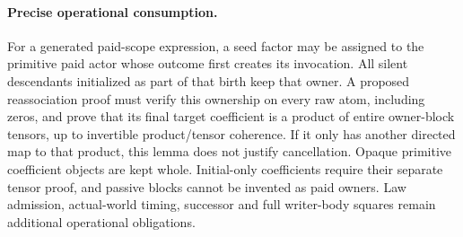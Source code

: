 \documentclass[11pt]{article}
\begin{document}
\paragraph{Precise operational consumption.} For a generated paid-scope expression, a seed factor may be assigned to the primitive paid actor whose outcome first creates its invocation. All silent descendants initialized as part of that birth keep that owner. A proposed reassociation proof must verify this ownership on every raw atom, including zeros, and prove that its final target coefficient is a product of entire owner-block tensors, up to invertible product/tensor coherence. If it only has another directed map to that product, this lemma does not justify cancellation. Opaque primitive coefficient objects are kept whole. Initial-only coefficients require their separate tensor proof, and passive blocks cannot be invented as paid owners. Law admission, actual-world timing, successor and full writer-body squares remain additional operational obligations.
\end{document}
